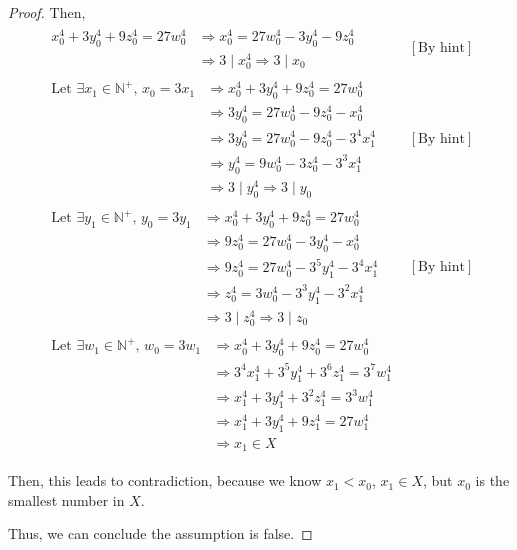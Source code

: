 \documentclass[12pt]{article}
\begin{document}
\begin{mdframed}
\begin{proof}
    Then,
    \setcounter{equation}{0}
    \begin{align}
        \begin{split}
        x_0^4 + 3y_0^4 + 9z_0^4 = 27w_0^4 &\Rightarrow x_0^4 = 27w_0^4 - 3y_0^4 - 9z_0^4\\
        & \Rightarrow 3 \mid x_0^4 \Rightarrow 3 \mid x_0
        \end{split} & [\text{By hint}]\\[1em]
        \begin{split}
        \text{Let $\exists x_1 \in \mathbb{N}^+$, $x_0 = 3x_1$} &\Rightarrow x_0^4 + 3y_0^4 + 9z_0^4 = 27w_0^4\\
        &\Rightarrow 3y_0^4 = 27w_0^4 - 9z_0^4 - x_0^4\\
        &\Rightarrow 3y_0^4 = 27w_0^4 - 9z_0^4 - 3^4x_1^4\\
        &\Rightarrow y_0^4 = 9w_0^4 - 3z_0^4 - 3^3x_1^4\\
        &\Rightarrow 3 \mid y_0^4 \Rightarrow 3 \mid y_0
        \end{split} & [\text{By hint}]\\[1em]
        \begin{split}
        \text{Let $\exists y_1 \in \mathbb{N}^+$, $y_0 = 3y_1$} &\Rightarrow x_0^4 + 3y_0^4 + 9z_0^4 = 27w_0^4\\
        &\Rightarrow 9z_0^4 = 27w_0^4 - 3y_0^4 - x_0^4\\
        &\Rightarrow 9z_0^4 = 27w_0^4 - 3^5y_1^4 - 3^4x_1^4\\
        &\Rightarrow z_0^4 = 3w_0^4 - 3^3y_1^4 - 3^2x_1^4\\
        &\Rightarrow 3 \mid z_0^4 \Rightarrow 3 \mid z_0
        \end{split} & [\text{By hint}]\\[1em]
        \begin{split}
        \text{Let $\exists w_1 \in \mathbb{N}^+$, $w_0 = 3w_1$} &\Rightarrow x_0^4 + 3y_0^4 + 9z_0^4 = 27w_0^4\\
        &\Rightarrow 3^4x_1^4 + 3^5y_1^4 + 3^6z_1^4 = 3^7w_1^4\\
        &\Rightarrow x_1^4 + 3y_1^4 + 3^2z_1^4 = 3^3w_1^4\\
        &\Rightarrow x_1^4 + 3y_1^4 + 9z_1^4 = 27w_1^4\\
        &\Rightarrow x_1 \in X
        \end{split}
    \end{align}

    \bigskip

    Then, this leads to contradiction, because we know $x_1 < x_0$, $x_1 \in X$,
    but $x_0$ is the smallest number in $X$.

    \bigskip

    Thus, we can conclude the assumption is false.

    \end{proof}

\end{mdframed}
\end{document}
